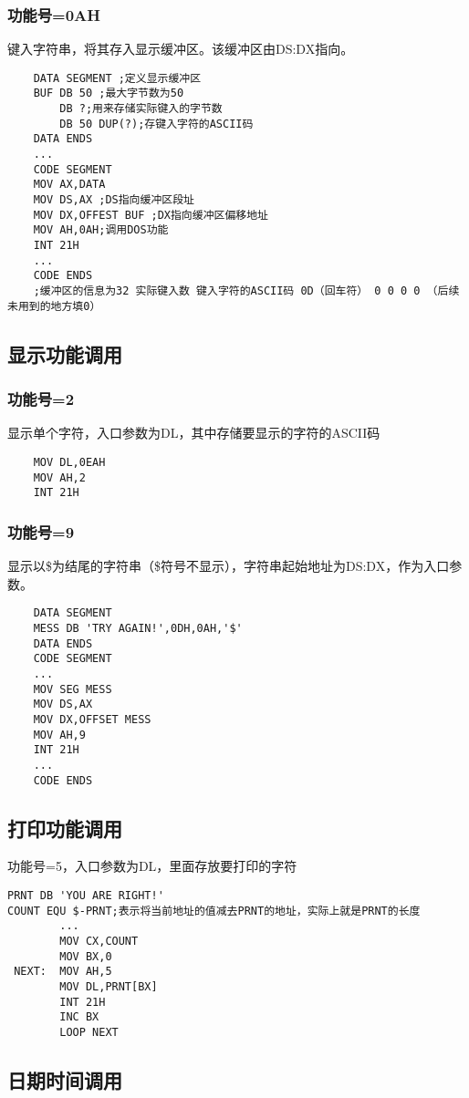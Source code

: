 \subsubsection{功能号=0AH}
键入字符串，将其存入显示缓冲区。该缓冲区由DS:DX指向。
\begin{lstlisting}
    DATA SEGMENT ;定义显示缓冲区
    BUF DB 50 ;最大字节数为50
        DB ?;用来存储实际键入的字节数
        DB 50 DUP(?);存键入字符的ASCII码
    DATA ENDS
    ... 
    CODE SEGMENT 
    MOV AX,DATA 
    MOV DS,AX ;DS指向缓冲区段址
    MOV DX,OFFEST BUF ;DX指向缓冲区偏移地址
    MOV AH,0AH;调用DOS功能
    INT 21H
    ... 
    CODE ENDS
    ;缓冲区的信息为32 实际键入数 键入字符的ASCII码 0D（回车符） 0 0 0 0 （后续未用到的地方填0）
\end{lstlisting}
\subsection{显示功能调用}
\subsubsection{功能号=2}
显示单个字符，入口参数为DL，其中存储要显示的字符的ASCII码
\begin{lstlisting}
    MOV DL,0EAH
    MOV AH,2
    INT 21H
\end{lstlisting}
\subsubsection{功能号=9}
显示以\$为结尾的字符串（\$符号不显示），字符串起始地址为DS:DX，作为入口参数。
\begin{lstlisting}
    DATA SEGMENT 
    MESS DB 'TRY AGAIN!',0DH,0AH,'$'
    DATA ENDS 
    CODE SEGMENT 
    ... 
    MOV SEG MESS
    MOV DS,AX
    MOV DX,OFFSET MESS 
    MOV AH,9
    INT 21H
    ... 
    CODE ENDS  
\end{lstlisting}
\subsection{打印功能调用}
功能号=5，入口参数为DL，里面存放要打印的字符
\begin{lstlisting}
PRNT DB 'YOU ARE RIGHT!'
COUNT EQU $-PRNT;表示将当前地址的值减去PRNT的地址，实际上就是PRNT的长度
        ... 
        MOV CX,COUNT 
        MOV BX,0
 NEXT:  MOV AH,5
        MOV DL,PRNT[BX]
        INT 21H
        INC BX 
        LOOP NEXT
\end{lstlisting}
\subsection{日期时间调用}
